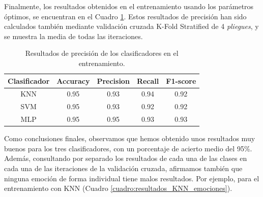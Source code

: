 Finalmente, los resultados obtenidos en el entrenamiento usando los parámetros óptimos, se encuentran en el Cuadro \ref{cuadro:resultados}. Estos resultados de precisión han sido calculados también mediante validación cruzada K-Fold Stratified de 4 \textit{pliegues}, y se muestra la media de todas las iteraciones.\\

\begin{table}[H]
\begin{center}
\begin{tabular}{|c|c|c|c|c|}
     \hline
    \textbf{Clasificador} & \textbf{Accuracy} & \textbf{Precision} & \textbf{Recall} & \textbf{F1-score}\\
    \hline
     KNN & 0.95 & 0.93 & 0.94 & 0.92\\
     SVM & 0.95 & 0.93 & 0.92 & 0.92\\
     MLP & 0.95 & 0.95 & 0.93 & 0.93\\
     \hline
 \end{tabular}
 \captionsetup{justification=centering}
\caption{Resultados de precisión de los clasificadores en el entrenamiento.}
\label{cuadro:resultados}
\end{center}
\end{table}

Como conclusiones finales, observamos que hemos obtenido unos resultados muy buenos para los tres clasificadores, con un porcentaje de acierto medio del 95\%. Además, consultando por separado los resultados de cada una de las clases en cada una de las iteraciones de la validación cruzada, afirmamos también que ninguna emoción de forma individual tiene malos resultados. Por ejemplo, para el entrenamiento con KNN (Cuadro \ref{cuadro:resultados_KNN_emociones}).\\

